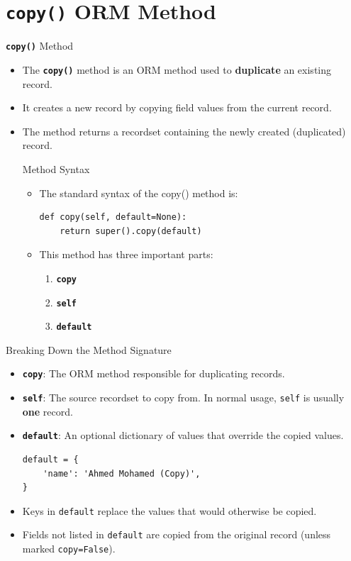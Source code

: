 
\section{\textbf{\texttt{copy()}} ORM Method}

\begin{frame}[fragile]{\textbf{\texttt{copy()}} Method}
	\begin{itemize}
		\item The \textbf{\texttt{copy()}} method is an ORM method used to \textbf{duplicate} an existing record.
		\item It creates a new record by copying field values from the current record.
		\item The method returns a recordset containing the newly created (duplicated) record.
\begin{block}{Method Syntax}
	\begin{itemize}
		\item The standard syntax of the copy() method is:
\begin{lstlisting}
def copy(self, default=None):
	return super().copy(default)
\end{lstlisting}
		\item This method has three important parts:
		\begin{enumerate}
			\item \textbf{\texttt{copy}}
			\item \textbf{\texttt{self}}
			\item \textbf{\texttt{default}}
		\end{enumerate}
	\end{itemize}
\end{block}
	\end{itemize}
\end{frame}

\begin{frame}[fragile]{Breaking Down the Method Signature}
	\begin{block}{}
		\begin{itemize}
			\item \textbf{\texttt{copy}}: The ORM method responsible for duplicating records.
			\item \textbf{\texttt{self}}: The source recordset to copy from. In normal usage, \texttt{self} is usually \textbf{one} record.
			\item \textbf{\texttt{default}}: An optional dictionary of values that override the copied values.
\begin{lstlisting}
default = {
	'name': 'Ahmed Mohamed (Copy)',
}
\end{lstlisting}
			\item Keys in \texttt{default} replace the values that would otherwise be copied.
			\item Fields not listed in \texttt{default} are copied from the original record (unless marked \texttt{copy=False}).
		\end{itemize}
	\end{block}
\end{frame}

